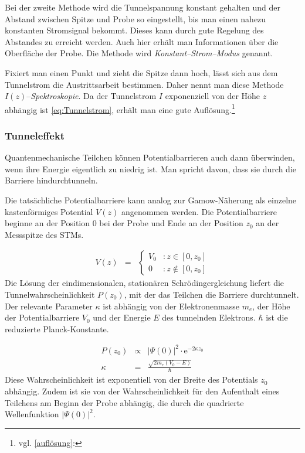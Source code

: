 \documentclass[12pt,a4paper]{scrartcl}
\numberwithin{equation}{section} %
\begin{document}
Bei der zweite Methode wird die Tunnelspannung konstant gehalten und der Abstand zwischen Spitze und Probe so eingestellt, bis man einen nahezu konstanten Stromsignal bekommt. Dieses kann durch gute Regelung des Abstandes zu erreicht werden. Auch hier erhält man Informationen über die Oberfläche der Probe. Die Methode wird \textit{Konstant--Strom--Modus} genannt.

Fixiert man einen Punkt und zieht die Spitze dann hoch, lässt sich aus dem Tunnelstrom die Austrittsarbeit bestimmen. Daher nennt man diese Methode $I(z)$--\textit{Spektroskopie}. Da der Tunnelstrom $I$ exponenziell von der Höhe $z$ abhängig ist \eqref{eq:Tunnelstrom}, erhält man eine gute Auflösung.\footnote{vgl. \ref{auflösung}: }

\hypertarget{tunneleffekt}{%
\subsubsection{Tunneleffekt}\label{tunneleffekt}}
Quantenmechanische Teilchen können Potentialbarrieren auch dann überwinden, wenn ihre Energie eigentlich zu niedrig ist. Man spricht davon, dass sie durch die Barriere hindurchtunneln.

Die tatsächliche Potentialbarriere kann analog zur Gamow-Näherung als einzelne kastenförmiges Potential $V(z)$ angenommen werden. Die Potentialbarriere beginne an der Position $0$ bei der Probe und Ende an der Position $z_0$ an der Messspitze des STMs.

\begin{eqnarray}
    V(z) &=&
        \begin{cases}
            V_0 &: z \in [0, z_0] \\
            0 &: z \notin [0, z_0]
        \end{cases}
\end{eqnarray}
Die Lösung der eindimensionalen, stationären Schrödingergleichung liefert die Tunnelwahrscheinlichkeit $P(z_0)$, mit der das Teilchen die Barriere durchtunnelt. Der relevante Parameter $\kappa$ ist abhängig von der Elektronenmasse $m_e$, der Höhe der Potentialbarriere $V_0$ und der Energie $E$ des tunnelnden Elektrons. $\hbar$ ist die reduzierte Planck-Konstante.

\begin{eqnarray}
    P(z_0) &\propto& |\Psi(0)|^2 \cdot \mathrm e^{-2\kappa z_0} \\
    \kappa &=& \frac{\sqrt{2m_e(V_0 - E)}}{\hbar} \label{eq:Tunnelwkt Kappa}
\end{eqnarray}
Diese Wahrscheinlichkeit ist exponentiell von der Breite des Potentials $z_0$ abhängig. Zudem ist sie von der Wahrscheinlichkeit für den Aufenthalt eines Teilchens am Beginn der Probe abhängig, die durch die quadrierte Wellenfunktion $|\Psi(0)|^2$.
\end{document}
